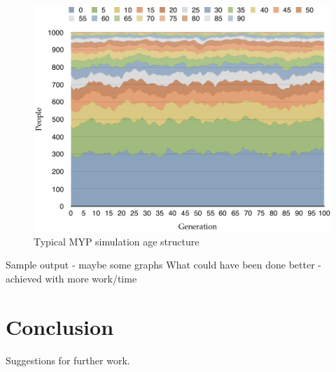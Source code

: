 \documentclass[authoryearcitations]{UoYCSproject}
\begin{document}
\begin{figure}[h]
\includegraphics[width=\textwidth]{myp_age_data}
\caption{Typical MYP simulation age structure}
\label{fig:mypResultsGraph}
\end{figure}



\begin{framed}
Sample output - maybe some graphs
What could have been done better - achieved with more work/time
\end{framed}

\chapter{Conclusion}
\label{cha:Conclusion}
Suggestions for further work.


 
\end{document}
